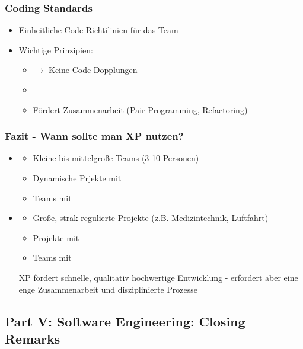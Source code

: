\subsubsection*{Coding Standards}
\begin{itemize}
    \item Einheitliche Code-Richtilinien für das Team
    \item Wichtige Prinzipien:
    \begin{itemize}
        \item {} $\rightarrow$ Keine Code-Dopplungen
        \item {}
        \item Fördert Zusammenarbeit (Pair Programming, Refactoring)
    \end{itemize}
\end{itemize}
\subsubsection*{Fazit - Wann sollte man XP nutzen?}
\begin{itemize}
    \item {}
    \begin{itemize}
        \item Kleine bis mittelgroße Teams (3-10 Personen)
        \item Dynamische Prjekte mit 
        \item Teams mit 
    \end{itemize}
    \item {}
    \begin{itemize}
        \item Große, strak regulierte Projekte (z.B. Medizintechnik, Luftfahrt)
        \item Projekte mit 
        \item Teams mit 
    \end{itemize}
     XP fördert schnelle, qualitativ hochwertige Entwicklung - erfordert aber eine enge Zusammenarbeit und disziplinierte Prozesse
\end{itemize}
\subsection{Part V: Software Engineering: Closing Remarks}
